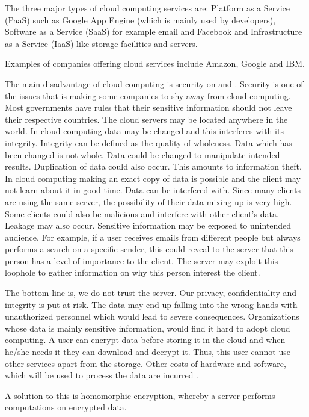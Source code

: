 The three major types of cloud computing services are: Platform as a Service (PaaS) such as Google App Engine (which is mainly used by developers), Software as a Service (SaaS) for example email and Facebook and Infrastructure as a Service (IaaS) like storage facilities and servers.

Examples of companies offering cloud services include Amazon, Google and IBM.

The main disadvantage of cloud computing is security on \citep{subashini2011survey} and \citep{miller2008cloud}. 
Security is one of the issues that is making some companies to shy away from cloud computing. Most governments have rules that their sensitive information should not leave their respective countries. The cloud servers may be located anywhere in the world. In cloud computing data may be changed and this interferes with its integrity. Integrity can be defined as the quality of wholeness. Data which has been changed is not whole. Data could be changed to manipulate intended results. Duplication of data could also occur. This amounts to information theft. In cloud computing making an exact copy of data is possible and the client may not learn about it in good time. Data can be interfered with. Since many clients are using the same server, the possibility of their data mixing up is very high. Some clients could also be malicious and interfere with other client's data. Leakage may also occur. Sensitive information may be exposed to unintended audience. For example, if a user receives emails from different people but always performs a search on a specific sender, this could reveal to the server that this person has a level of importance to the client. The server may exploit this loophole to gather information on why this person interest the client.

The bottom line is, we do not trust the server. Our privacy, confidentiality and integrity is put at risk. The data may end up falling into the wrong hands with unauthorized personnel which would lead to severe consequences. Organizations whose data is mainly sensitive information, would find it hard to adopt cloud computing. A user can encrypt data before storing it in the cloud and when he/she needs it they can download and decrypt it. Thus, this user cannot use other services apart from the storage. Other costs of hardware and software, which will be used to process the data are incurred \citep{yang2013evaluation}.

A solution to this is homomorphic encryption, whereby a server performs computations on encrypted data.

